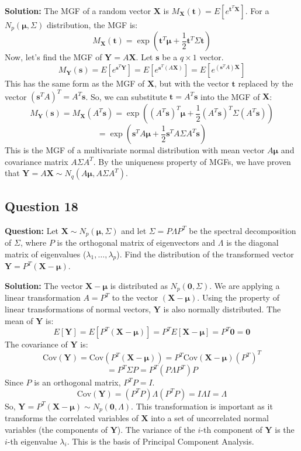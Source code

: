 \textbf{Solution:}
The MGF of a random vector $\mathbf{X}$ is $M_{\mathbf{X}}(\mathbf{t}) = E[e^{\mathbf{t}^T\mathbf{X}}]$. For a $N_p(\boldsymbol{\mu}, \Sigma)$ distribution, the MGF is:
$$ M_{\mathbf{X}}(\mathbf{t}) = \exp(\mathbf{t}^T\boldsymbol{\mu} + \frac{1}{2}\mathbf{t}^T\Sigma\mathbf{t}) $$
Now, let's find the MGF of $\mathbf{Y} = A\mathbf{X}$. Let $\mathbf{s}$ be a $q \times 1$ vector.
$$ M_{\mathbf{Y}}(\mathbf{s}) = E[e^{\mathbf{s}^T\mathbf{Y}}] = E[e^{\mathbf{s}^T(A\mathbf{X})}] = E[e^{(\mathbf{s}^T A)\mathbf{X}}] $$
This has the same form as the MGF of $\mathbf{X}$, but with the vector $\mathbf{t}$ replaced by the vector $(\mathbf{s}^T A)^T = A^T\mathbf{s}$.
So, we can substitute $\mathbf{t} = A^T\mathbf{s}$ into the MGF of $\mathbf{X}$:
$$ M_{\mathbf{Y}}(\mathbf{s}) = M_{\mathbf{X}}(A^T\mathbf{s}) = \exp((A^T\mathbf{s})^T\boldsymbol{\mu} + \frac{1}{2}(A^T\mathbf{s})^T\Sigma(A^T\mathbf{s})) $$
$$ = \exp(\mathbf{s}^T A \boldsymbol{\mu} + \frac{1}{2}\mathbf{s}^T A \Sigma A^T \mathbf{s}) $$
This is the MGF of a multivariate normal distribution with mean vector $A\boldsymbol{\mu}$ and covariance matrix $A\Sigma A^T$.
By the uniqueness property of MGFs, we have proven that $\mathbf{Y} = A\mathbf{X} \sim N_q(A\boldsymbol{\mu}, A\Sigma A^T)$.

\subsection*{Question 18}
\textbf{Question:} Let $\mathbf{X} \sim N_p(\boldsymbol{\mu}, \Sigma)$ and let $\Sigma = P \Lambda P^T$ be the spectral decomposition of $\Sigma$, where $P$ is the orthogonal matrix of eigenvectors and $\Lambda$ is the diagonal matrix of eigenvalues ($\lambda_1, \dots, \lambda_p$). Find the distribution of the transformed vector $\mathbf{Y} = P^T(\mathbf{X} - \boldsymbol{\mu})$.

\textbf{Solution:}
The vector $\mathbf{X} - \boldsymbol{\mu}$ is distributed as $N_p(\mathbf{0}, \Sigma)$.
We are applying a linear transformation $A = P^T$ to the vector $(\mathbf{X} - \boldsymbol{\mu})$.
Using the property of linear transformations of normal vectors, $\mathbf{Y}$ is also normally distributed.
The mean of $\mathbf{Y}$ is:
$$ E[\mathbf{Y}] = E[P^T(\mathbf{X} - \boldsymbol{\mu})] = P^T E[\mathbf{X} - \boldsymbol{\mu}] = P^T \mathbf{0} = \mathbf{0} $$
The covariance of $\mathbf{Y}$ is:
$$ \text{Cov}(\mathbf{Y}) = \text{Cov}(P^T(\mathbf{X} - \boldsymbol{\mu})) = P^T \text{Cov}(\mathbf{X} - \boldsymbol{\mu}) (P^T)^T $$
$$ = P^T \Sigma P = P^T (P \Lambda P^T) P $$
Since $P$ is an orthogonal matrix, $P^T P = I$.
$$ \text{Cov}(\mathbf{Y}) = (P^T P) \Lambda (P^T P) = I \Lambda I = \Lambda $$
So, $\mathbf{Y} = P^T(\mathbf{X} - \boldsymbol{\mu}) \sim N_p(\mathbf{0}, \Lambda)$.
This transformation is important as it transforms the correlated variables of $\mathbf{X}$ into a set of uncorrelated normal variables (the components of $\mathbf{Y}$). The variance of the $i$-th component of $\mathbf{Y}$ is the $i$-th eigenvalue $\lambda_i$. This is the basis of Principal Component Analysis.

